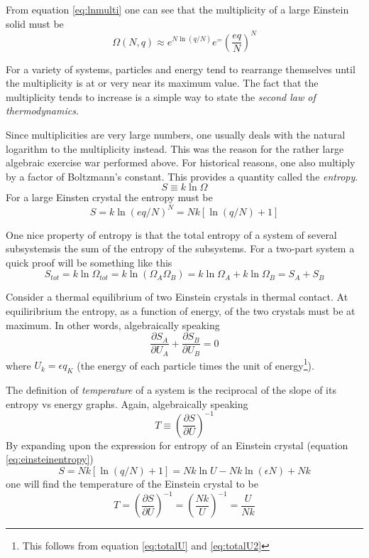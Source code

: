 \documentclass[10pt,a4paper]{amsart}
\begin{document}
From equation \ref{eq:lnmulti} one can see that the multiplicity of a large Einstein solid must be 
\begin{equation}
\label{eq:largemulti}
\Omega (N,q) \approx e^{N \ln (q/N)}e^= \left(\frac{eq}{N}\right)^N
\end{equation}

For a variety of systems, particles and energy tend to rearrange themselves until the multiplicity is at or very near its maximum value. The fact that the multiplicity tends to increase is a simple way to state the \emph{second law of thermodynamics}.

Since multiplicities are very large numbers, one usually deals with the natural logarithm to the multiplicity instead. This was the reason for the rather large algebraic exercise war performed above. For historical reasons, one also multiply by a factor of Boltzmann's constant. This provides a quantity called the \emph{entropy}.
\begin{equation}
\label{eq:entropy}
S \equiv k \ln \Omega
\end{equation} 
For a large Einsten crystal the entropy must be
\begin{equation}
\label{eq:einsteinentropy}
S=k \ln (eq/N)^N = Nk[\ln (q/N) + 1]
\end{equation}

One nice property of entropy is that the total entropy of a system of several subsystemsis the sum of the entropy of the subsystems. For a two-part system a quick proof will be something like this
\begin{equation}
S_{tot}=k \ln \Omega_{tot} = k \ln (\Omega_A\Omega_B) = k \ln \Omega_A + k \ln \Omega_B = S_A + S_B
\end{equation}

Consider a thermal equilibrium of two Einstein crystals in thermal contact. At equiliribrium the entropy, as a function of energy, of the two crystals must be at maximum. In other words, algebraically speaking
\begin{equation}
\frac{\partial S_A}{\partial U_A} + \frac{\partial S_B}{\partial U_B} = 0
\end{equation}
where $U_k= \epsilon q_K$ (the energy of each particle times the unit of energy\footnote{This follows from equation \ref{eq:totalU} and \ref{eq:totalU2}}). 

The definition of \emph{temperature} of a system is the reciprocal of the slope of its entropy vs energy graphs. Again, algebraically speaking
\begin{equation}
T \equiv \left(\frac{\partial S}{\partial U} \right)^{-1}
\end{equation}
By expanding upon the expression for entropy of an Einstein crystal (equation \ref{eq:einsteinentropy})
\begin{equation}
S= Nk[\ln (q/N) + 1]
= Nk \ln U -Nk \ln (\epsilon N) + Nk
\end{equation}
one will find the temperature of the Einstein crystal to be
\begin{equation}
T = \left(\frac{\partial S}{\partial U} \right)^{-1}
= \left(\frac{Nk}{U} \right)^{-1} = \frac{U}{Nk} 
\end{equation}
\end{document}
